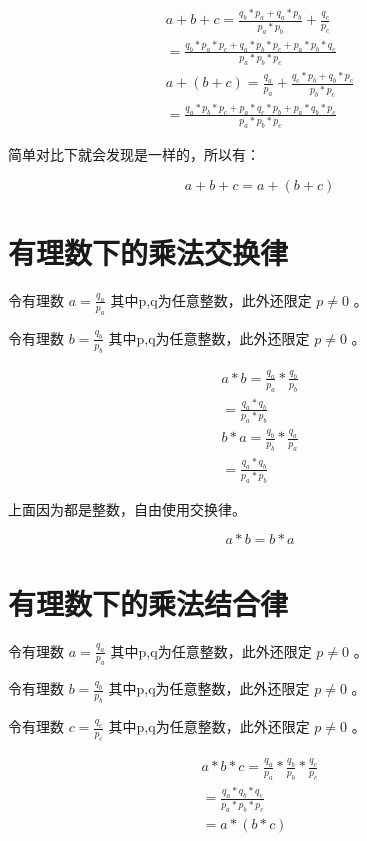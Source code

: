 \documentclass[12pt,oneside]{book}
\begin{document}
\begin{align*}
a + b + c = \frac{q_b * p_a + q_a * p_b}{p_a * p_b} + \frac{q_c}{p_c}\\
=\frac{q_b*p_a*p_c + q_a*p_b*p_c + p_a*p_b*q_c}{p_a*p_b*p_c}\\
a + (b + c) =  \frac{q_a}{p_a} + \frac{q_c * p_b + q_b * p_c}{p_b * p_c}\\
=\frac{q_a*p_b*p_c + p_a*q_c*p_b + p_a*q_b*p_c}{p_a*p_b*p_c}
\end{align*}

简单对比下就会发现是一样的，所以有：

\begin{equation}
a + b + c  = a+(b+c)
\end{equation}



\section{有理数下的乘法交换律}
令有理数 $a = \frac{q_a}{p_a}$ 其中p,q为任意整数，此外还限定 $p \neq 0$ 。

令有理数 $b = \frac{q_b}{p_b}$ 其中p,q为任意整数，此外还限定 $p \neq 0$ 。

\begin{align*}
a * b = \frac{q_a}{p_a} * \frac{q_b}{p_b}\\
= \frac{q_a * q_b}{p_a*p_b} \\
b * a =  \frac{q_b}{p_b} * \frac{q_a}{p_a} \\
= \frac{q_a * q_b}{p_a*p_b} 
\end{align*}

上面因为都是整数，自由使用交换律。

\begin{equation}
a * b = b * a
\end{equation}


\section{有理数下的乘法结合律}
令有理数 $a = \frac{q_a}{p_a}$ 其中p,q为任意整数，此外还限定 $p \neq 0$ 。

令有理数 $b = \frac{q_b}{p_b}$ 其中p,q为任意整数，此外还限定 $p \neq 0$ 。

令有理数 $c = \frac{q_c}{p_c}$ 其中p,q为任意整数，此外还限定 $p \neq 0$ 。

\begin{align*}
a * b * c = \frac{q_a}{p_a} * \frac{q_b}{p_b} * \frac{q_c}{p_c}\\
= \frac{q_a * q_b * q_c}{p_a*p_b*p_c} \\
= a * (b *c)
\end{align*}
\end{document}
